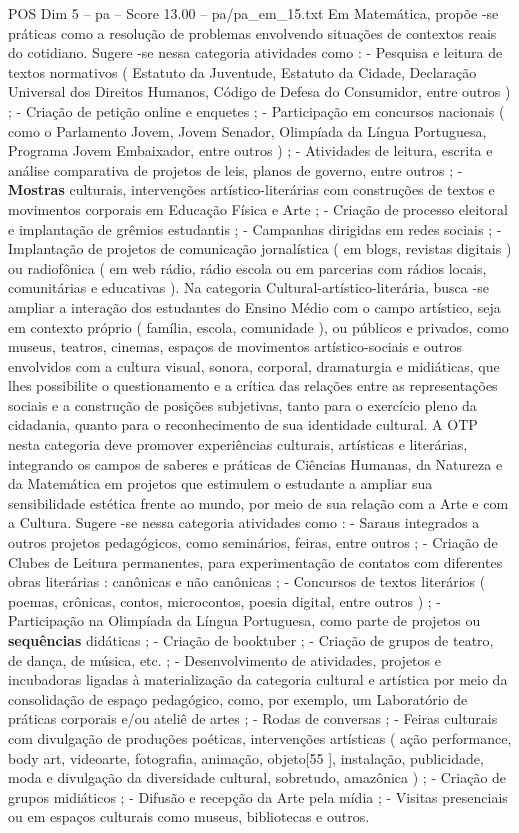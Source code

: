 \begin{textsample}{POS Dim 5 – pa – Score 13.00 – pa/pa\_em\_15.txt}
Em Matemática, propõe -se práticas como a resolução de problemas envolvendo situações de contextos reais do cotidiano.
Sugere -se nessa categoria atividades como : - Pesquisa e leitura de textos normativos ( Estatuto da Juventude, Estatuto da Cidade, Declaração Universal dos Direitos Humanos, Código de Defesa do Consumidor, entre outros ) ; - Criação de petição online e enquetes ; - Participação em concursos nacionais ( como o Parlamento Jovem, Jovem Senador, Olimpíada da Língua Portuguesa, Programa Jovem Embaixador, entre outros ) ; - Atividades de leitura, escrita e análise comparativa de projetos de leis, planos de governo, entre outros ; - \textbf{Mostras} culturais, intervenções artístico-literárias com construções de textos e movimentos corporais em Educação Física e Arte ; - Criação de processo eleitoral e implantação de grêmios estudantis ; - Campanhas dirigidas em redes sociais ; - Implantação de projetos de comunicação jornalística ( em blogs, revistas digitais ) ou radiofônica ( em web rádio, rádio escola ou em parcerias com rádios locais, comunitárias e educativas ).
Na categoria Cultural-artístico-literária, busca -se ampliar a interação dos estudantes do Ensino Médio com o campo artístico, seja em contexto próprio ( família, escola, comunidade ), ou públicos e privados, como museus, teatros, cinemas, espaços de movimentos artístico-sociais e outros envolvidos com a cultura visual, sonora, corporal, dramaturgia e midiáticas, que lhes possibilite o questionamento e a crítica das relações entre as representações sociais e a construção de posições subjetivas, tanto para o exercício pleno da cidadania, quanto para o reconhecimento de sua identidade cultural.
A OTP nesta categoria deve promover experiências culturais, artísticas e literárias, integrando os campos de saberes e práticas de Ciências Humanas, da Natureza e da Matemática em projetos que estimulem o estudante a ampliar sua sensibilidade estética frente ao mundo, por meio de sua relação com a Arte e com a Cultura.
Sugere -se nessa categoria atividades como : - Saraus integrados a outros projetos pedagógicos, como seminários, feiras, entre outros ; - Criação de Clubes de Leitura permanentes, para experimentação de contatos com diferentes obras literárias : canônicas e não canônicas ; - Concursos de textos literários ( poemas, crônicas, contos, microcontos, poesia digital, entre outros ) ; - Participação na Olimpíada da Língua Portuguesa, como parte de projetos ou \textbf{sequências} didáticas ; - Criação de booktuber ; - Criação de grupos de teatro, de dança, de música, etc. ; - Desenvolvimento de atividades, projetos e incubadoras ligadas à materialização da categoria cultural e artística por meio da consolidação de espaço pedagógico, como, por exemplo, um Laboratório de práticas corporais e/ou ateliê de artes ; - Rodas de conversas ; - Feiras culturais com divulgação de produções poéticas, intervenções artísticas ( ação performance, body art, videoarte, fotografia, animação, objeto[55 ], instalação, publicidade, moda e divulgação da diversidade cultural, sobretudo, amazônica ) ; - Criação de grupos midiáticos ; - Difusão e recepção da Arte pela mídia ; - Visitas presenciais ou em espaços culturais como museus, bibliotecas e outros.

\end{textsample}
